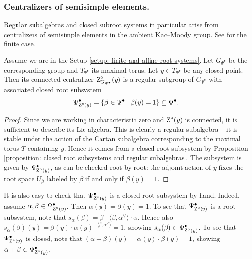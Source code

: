 \subsubsection{Centralizers of semisimple elements.}
Regular subalgebras and closed subroot systems in particular arise from centralizers of semisimple elements in the ambient Kac--Moody group. See \cite[Chapter II, \S 6, No.21, Corollaries to Theorem 6.7]{Dyn57} for the finite case.
\begin{lemma}\label{lemma: centralizers give closed subroot systems}
Assume we are in the Setup \ref{setup: finite and affine root systems}. Let $G_{\Psi^{\bullet}}$ be the corresponding group and $T_{\Psi^{\bullet}}$ its maximal torus.
Let $y \in T_{\Psi^{\bullet}}$ be any closed point. Then its connected centralizer $\operatorname{Z}^{\circ}_{G_{\Psi^{\bullet}}}(y)$ is a regular subgroup of $G_{\Psi^{\bullet}}$ with associated closed root subsystem 
\begin{equation*}
   \Psi^{\bullet}_{\operatorname{Z}^{\circ}(y)} = \{ \beta \in \Psi^{\bullet} \mid \beta(y) = 1 \} \subseteq \Psi^{\bullet}.
\end{equation*}
\end{lemma}
\begin{proof}

Since we are working in characteristic zero and $\operatorname{Z}^{\circ}(y)$ is connected, it is sufficient to describe its Lie algebra. This is clearly a regular subalgebra -- it is stable under the action of the Cartan subalgebra corresponding to the maximal torus $T$ containing $y$. Hence it comes from a closed root subsystem by Proposition \ref{proposition: closed root subsystems and regular subalgebras}. The subsystem is given by $\Psi^{\bullet}_{\operatorname{Z}^{\circ}(y)}$, as can be checked root-by-root: the adjoint action of $y$ fixes the root space $U_{\beta}$ labeled by $\beta$ if and only if $\beta(y)=1$.
\end{proof}

\begin{remark}
It is also easy to check that $\Psi^{\bullet}_{\operatorname{Z}^{\circ}(y)}$ is a closed root subsystem by hand. Indeed, assume $\alpha, \beta \in \Psi^{\bullet}_{\operatorname{Z}^{\circ}(y)}$. Then $\alpha(y) = \beta(y) =1$.
%
To see that $\Psi^{\bullet}_{\operatorname{Z}^{\circ}(y)}$ is a root subsystem, note that $s_{\alpha}(\beta) = \beta {-\langle \beta, \alpha^{\vee} \rangle}\cdot \alpha$. Hence also $s_{\alpha}(\beta)(y) = \beta(y) \cdot \alpha(y)^{-\langle \beta, \alpha^{\vee} \rangle} = 1$, showing $s_{\alpha}(\beta) \in \Psi^{\bullet}_{\operatorname{Z}^{\circ}(y)}$. 
%
To see that $\Psi^{\bullet}_{\operatorname{Z}^{\circ}(y)}$ is closed, note that $(\alpha + \beta)(y) = \alpha(y) \cdot \beta(y) = 1$, showing $\alpha + \beta \in \Psi^{\bullet}_{\operatorname{Z}^{\circ}(y)}$.
\end{remark}




